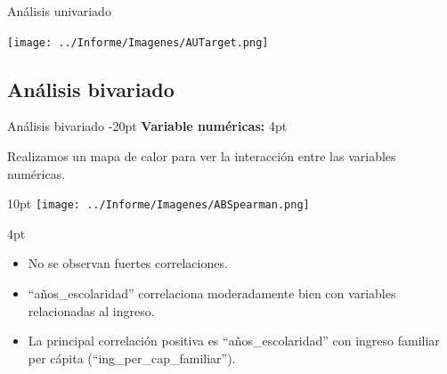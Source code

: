 \documentclass[pdf]{beamer}
\def\vspace{}%
\begin{document}
{\begin{frame}{Análisis univariado}
    \begin{center}
        \texttt{[image: ../Informe/Imagenes/AUTarget.png]}    
    \end{center}

\end{frame}
    
    \subsection{Análisis bivariado}

\begin{frame}{Análisis bivariado}
    \vspace{-20pt}
    \textbf{Variable numéricas:}
    \vspace{4pt}

    Realizamos un mapa de calor para ver la interacción entre las variables numéricas.

    \begin{minipage}{0.46\textwidth}
        \vspace{10pt}
        \texttt{[image: ../Informe/Imagenes/ABSpearman.png]}
    \end{minipage}
    \begin{minipage}{0.46\textwidth}
        \vspace{4pt}
        \begin{itemize}
            \justifying%
            \item No se observan fuertes correlaciones.
            \item ``años\_escolaridad'' correlaciona moderadamente bien con variables relacionadas al ingreso.
            \item La principal correlación positiva es ``años\_escolaridad'' con ingreso familiar per cápita (``ing\_per\_cap\_familiar'').
        \end{itemize}
    \end{minipage}

\end{frame}
 

 
}
\end{document}
